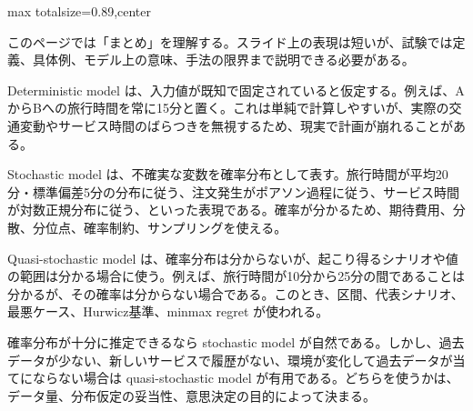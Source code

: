 \begin{minipage}[t]{0.58\textwidth}
\begin{adjustbox}{max totalsize={\textwidth}{0.89\textheight},center}
\begin{minipage}{\textwidth}\scriptsize
{}このページでは「まとめ」を理解する。スライド上の表現は短いが、試験では定義、具体例、モデル上の意味、手法の限界まで説明できる必要がある。\par
Deterministic model は、入力値が既知で固定されていると仮定する。例えば、AからBへの旅行時間を常に15分と置く。これは単純で計算しやすいが、実際の交通変動やサービス時間のばらつきを無視するため、現実で計画が崩れることがある。\par
Stochastic model は、不確実な変数を確率分布として表す。旅行時間が平均20分・標準偏差5分の分布に従う、注文発生がポアソン過程に従う、サービス時間が対数正規分布に従う、といった表現である。確率が分かるため、期待費用、分散、分位点、確率制約、サンプリングを使える。\par
Quasi-stochastic model は、確率分布は分からないが、起こり得るシナリオや値の範囲は分かる場合に使う。例えば、旅行時間が10分から25分の間であることは分かるが、その確率は分からない場合である。このとき、区間、代表シナリオ、最悪ケース、Hurwicz基準、minmax regret が使われる。\par
確率分布が十分に推定できるなら stochastic model が自然である。しかし、過去データが少ない、新しいサービスで履歴がない、環境が変化して過去データが当てにならない場合は quasi-stochastic model が有用である。どちらを使うかは、データ量、分布仮定の妥当性、意思決定の目的によって決まる。\par

\end{minipage}
\end{adjustbox}
\end{minipage}

